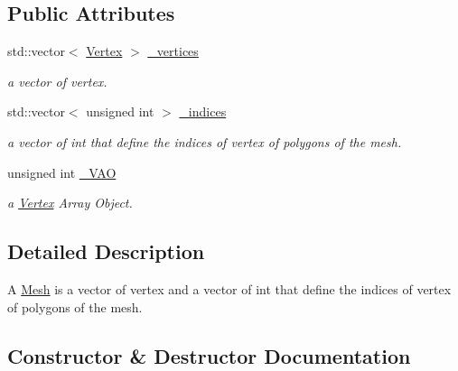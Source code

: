 \subsection*{Public Attributes}
\begin{DoxyCompactItemize}
\item 
\mbox{\label{class_mesh_ac8bc82604ad2b353e0f3f22edb166960}} 
std\+::vector$<$ \mbox{\hyperlink{class_vertex}{Vertex}} $>$ \mbox{\hyperlink{class_mesh_ac8bc82604ad2b353e0f3f22edb166960}{\+\_\+vertices}}
\begin{DoxyCompactList}\small\item\em a vector of vertex. \end{DoxyCompactList}\item 
\mbox{\label{class_mesh_a79f0d5bbd4dba6a7f6cb3b9eb6854ddf}} 
std\+::vector$<$ unsigned int $>$ \mbox{\hyperlink{class_mesh_a79f0d5bbd4dba6a7f6cb3b9eb6854ddf}{\+\_\+indices}}
\begin{DoxyCompactList}\small\item\em a vector of int that define the indices of vertex of polygons of the mesh. \end{DoxyCompactList}\item 
\mbox{\label{class_mesh_a88114ad56bdd0ff198a39aaf7c5ea12e}} 
unsigned int \mbox{\hyperlink{class_mesh_a88114ad56bdd0ff198a39aaf7c5ea12e}{\+\_\+\+V\+AO}}
\begin{DoxyCompactList}\small\item\em a \mbox{\hyperlink{class_vertex}{Vertex}} Array Object. \end{DoxyCompactList}\end{DoxyCompactItemize}


\subsection{Detailed Description}
A \mbox{\hyperlink{class_mesh}{Mesh}} is a vector of vertex and a vector of int that define the indices of vertex of polygons of the mesh. 

\subsection{Constructor \& Destructor Documentation}
\mbox{\label{class_mesh_a9471cc66749be2d05a9e2bdf77090450}} 
